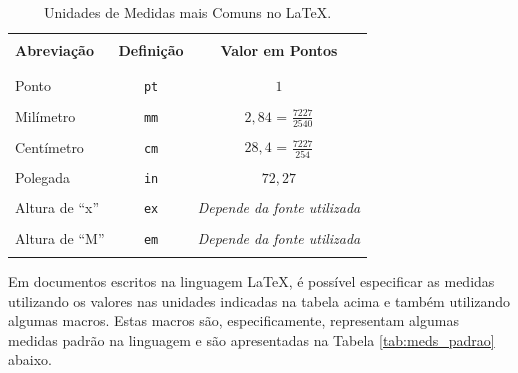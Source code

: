 \begin{table}[H]
\centering
\caption{Unidades de Medidas mais Comuns no LaTeX.}
\label{tab:medidas}
    \begin{tabular}{p{3cm}c{3cm}c{5cm}}
    \hline
    \\[-0.5em]
    \textbf{Abreviação} & \textbf{Definição} & \textbf{Valor em Pontos} \\
    \\[-0.5em]
    \hline
    \hline
    \\[-0.5em]
    Ponto           & \texttt{pt} & $1$                              \\
    \\[-0.5em]
    Milímetro       & \texttt{mm} & $2,84$ = $\frac{7227}{2540}$     \\
    \\[-0.5em]
    Centímetro      & \texttt{cm} & $28,4$ = $\frac{7227}{254}$      \\
    \\[-0.5em]
    Polegada        & \texttt{in} & $72,27$     \\
    \\[-0.5em]
    Altura de ``x'' & \texttt{ex} & \textit{Depende da fonte utilizada} \\
    \\[-0.5em]
    Altura de ``M'' & \texttt{em} & \textit{Depende da fonte utilizada} \\
    \\[-0.5em]
    \hline
    \end{tabular}
\end{table}

Em documentos escritos na linguagem LaTeX, é possível especificar as medidas utilizando os valores nas unidades indicadas na tabela acima e também utilizando algumas macros. Estas macros são, especificamente, representam algumas medidas padrão na linguagem e são apresentadas na Tabela \ref{tab:meds_padrao} abaixo.

